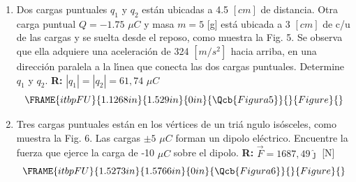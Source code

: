 \documentclass[12pt]{article}
\begin{document}
\begin{enumerate}
\item Dos cargas puntuales $q_{1}$ y $q_{2}$ est\'{a}n ubicadas a 4.5 $[cm]$
de distancia. Otra carga puntual $Q=-1.75$ $\mu C$ y masa $m=5$ [g] est\'{a}
ubicada a 3 $[cm]$ de c/u de las cargas y se suelta desde el reposo, como
muestra la Fig. 5. Se observa que ella adquiere una aceleraci\'{o}n de 324 $%
[m/s^{2}]\,\ $hacia arriba, en una direcci\'{o}n paralela a la l\'{\i}nea
que conecta las dos cargas puntuales. Determine $q_{1}$ y $q_{2}.$ \textbf{%
R: }$\left\vert q_{1}\right\vert =\left\vert q_{2}\right\vert =61,74$ $\mu C$%
\begin{equation*}
\FRAME{itbpFU}{1.1268in}{1.529in}{0in}{\Qcb{Figura 5}}{}{Figure}{\special%
{language "Scientific Word";type "GRAPHIC";maintain-aspect-ratio
TRUE;display "USEDEF";valid_file "T";width 1.1268in;height 1.529in;depth
0in;original-width 2.1525in;original-height 2.9317in;cropleft "0";croptop
"1";cropright "1";cropbottom "0";tempfilename
'QYQ9VJ05.wmf';tempfile-properties "XPR";}}
\end{equation*}

\item Tres cargas puntuales est\'{a}n en los v\'{e}rtices de un tri\'{a}%
ngulo is\'{o}sceles, como muestra la Fig. 6. Las cargas $\pm 5$ $\mu C$
forman un dipolo el\'{e}ctrico. Encuentre la fuerza que ejerce la carga de
-10 $\mu C$ sobre el dipolo. \textbf{R:} $\vec{F}=1687,49\hat{\jmath}$ [N] 
\begin{equation*}
\FRAME{itbpFU}{1.5273in}{1.5766in}{0in}{\Qcb{Figura 6}}{}{Figure}{\special%
{language "Scientific Word";type "GRAPHIC";maintain-aspect-ratio
TRUE;display "USEDEF";valid_file "T";width 1.5273in;height 1.5766in;depth
0in;original-width 2.9871in;original-height 3.0839in;cropleft "0";croptop
"1";cropright "1";cropbottom "0";tempfilename
'QYQ9VJ06.wmf';tempfile-properties "XPR";}}
\end{equation*}
\end{enumerate}
\end{document}
